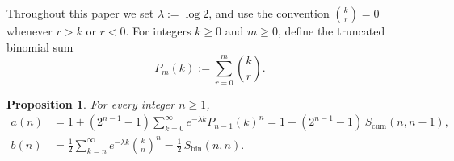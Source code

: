 \documentclass[11pt,a4paper]{article}
\newtheorem{proposition}[theorem]{Proposition}
\theoremstyle{remark}
\begin{document}
Throughout this paper we set $\lambda := \log 2$, and use the convention $\binom{k}{r}=0$ whenever $r>k$ or $r<0$. For integers $k\ge 0$ and $m\ge 0$, define the truncated binomial sum
\[
  P_m(k) := \sum_{r=0}^{m}\binom{k}{r}.
\]

\begin{proposition}\label{prop:series}
For every integer $n\ge 1$,
\begin{align}
  a(n) &= 1 + (2^{n-1}-1)\sum_{k=0}^{\infty} e^{-\lambda k} P_{n-1}(k)^n
       = 1 + (2^{n-1}-1)\,S_{\mathrm{cum}}(n,n-1), \label{eq:a-series}\\
  b(n) &= \frac{1}{2}\sum_{k=n}^{\infty} e^{-\lambda k} \binom{k}{n}^n
       = \frac{1}{2}\,S_{\mathrm{bin}}(n,n). \label{eq:b-series}
\end{align}
\end{proposition}
\end{document}
